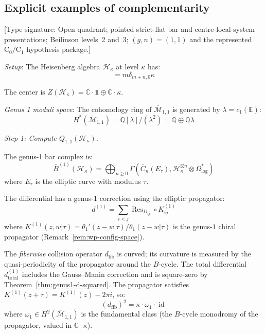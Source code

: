 \subsection{Explicit examples of complementarity}

\begin{example}
\label{ex:heisenberg-complementarity-explicit}
\textup{[Type signature: Open quadrant; pointed strict-flat bar and
centre-local-system presentations; Beilinson levels~2 and~3;
\((g,n)=(1,1)\) and the represented \(\mathrm C_0/\mathrm C_1\)
hypothesis package.]}

\emph{Setup}: The Heisenberg algebra $\mathcal{H}_\kappa$ at level $\kappa$ has:
\begin{equation}
[a_m, a_n] = m\delta_{m+n,0} \kappa
\end{equation}

The center is $Z(\mathcal{H}_\kappa) = \mathbb{C} \cdot \mathbb{1} \oplus \mathbb{C}
\cdot \kappa$.

\emph{Genus 1 moduli space}: The cohomology ring of $\overline{\mathcal{M}}_{1,1}$ is generated by $\lambda = c_1(\mathbb{E})$:
\begin{equation}
H^*(\overline{\mathcal{M}}_{1,1}) = \mathbb{Q}[\lambda] / (\lambda^2) = \mathbb{Q}
\oplus \mathbb{Q}\lambda
\end{equation}

\emph{Step 1: Compute $Q_{1,1}(\mathcal{H}_\kappa)$}.

The genus-1 bar complex is:
\begin{equation}
\bar{B}^{(1)}(\mathcal{H}_\kappa) = \bigoplus_{n \geq 0} \Gamma(\overline{C}_n(E_\tau),
\mathcal{H}_\kappa^{\boxtimes n} \otimes \Omega^*_{\log})
\end{equation}
where $E_\tau$ is the elliptic curve with modulus $\tau$.

The differential has a genus-1 correction using the elliptic propagator:
\begin{equation}
d^{(1)} = \sum_{i<j} \operatorname{Res}_{D_{ij}} \circ K^{(1)}_{ij}
\end{equation}
where $K^{(1)}(z,w|\tau) = \theta_1'(z-w|\tau)/\theta_1(z-w|\tau)$ is the genus-$1$ chiral propagator (Remark~\ref{rem:wp-config-space}).

The \emph{fiberwise} collision operator $d_{\mathrm{fib}}$ is curved;
its curvature is measured by the quasi-periodicity of the propagator
around the $B$-cycle.  The total differential
$d^{(1)}_{\mathrm{total}}$ includes the Gauss--Manin correction and is
square-zero by Theorem~\ref{thm:genus1-d-squared}.
The propagator satisfies $K^{(1)}(z+\tau) = K^{(1)}(z) - 2\pi i$, so:
\begin{equation}
(d_{\mathrm{fib}})^2 = \kappa \cdot \omega_1 \cdot \operatorname{id}
\end{equation}
where $\omega_1 \in H^2(\overline{\mathcal{M}}_{1,1})$ is the fundamental class (the $B$-cycle monodromy of the propagator, valued in $\mathbb{C} \cdot \kappa$).


\end{example}
